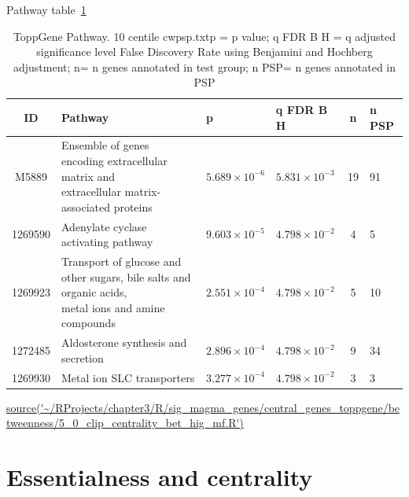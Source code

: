 Pathway table~\ref{tab:ToppGENE Pathway. 10 centile cwpsp.txtp = p value; q FDR B H = q adjusted significance level False Discovery Rate using Benjamini and Hochberg adjustment; n= n genes annotated in test group; n PSP= n genes annotated in PSP} 

\begin{table}[ht]
\centering
\begin{adjustbox}{width=\textwidth}
\setlength{\extrarowheight}{2pt}
\begin{tabular}{@{}clllcl@{}}

  \toprule
ID & Pathway & p & q FDR B H & n & n PSP \\ 
  \midrule
M5889 & \makecell{Ensemble of genes encoding extracellular matrix and\\ extracellular matrix-associated proteins}  & $5.689 \times 10^{-6}$ & $5.831 \times 10^{-3}$ & 19 & 91 \\ 
  1269590 & Adenylate cyclase activating pathway & $9.603 \times 10^{-5}$ & $4.798 \times 10^{-2}$ & 4 & 5 \\ 
  1269923 &\makecell{ Transport of glucose and other sugars, bile salts and organic acids,\\ metal ions and amine compounds} & $2.551 \times 10^{-4}$ & $4.798 \times 10^{-2}$ & 5 & 10 \\ 
  1272485 & Aldosterone synthesis and secretion & $2.896 \times 10^{-4}$ & $4.798 \times 10^{-2}$ & 9 & 34 \\ 
  1269930 & Metal ion SLC transporters & $3.277 \times 10^{-4}$ & $4.798 \times 10^{-2}$ & 3 & 3 \\ 
   \bottomrule
\end{tabular}
\end{adjustbox}
\caption{ToppGene Pathway. 10 centile cwpsp.txtp = p value; q FDR B H = q adjusted significance level False Discovery Rate using Benjamini and Hochberg adjustment; n= n genes annotated in test group; n PSP= n genes annotated in PSP} 
\tiny\url{source('~/RProjects/chapter3/R/sig_magma_genes/central_genes_toppgene/betweenness/5_0_clip_centrality_bet_hig_mf.R')}

\label{tab:ToppGENE Pathway. 10 centile cwpsp.txtp = p value; q FDR B H = q adjusted significance level False Discovery Rate using Benjamini and Hochberg adjustment; n= n genes annotated in test group; n PSP= n genes annotated in PSP}
\end{table}


 \section{Essentialness and centrality}
